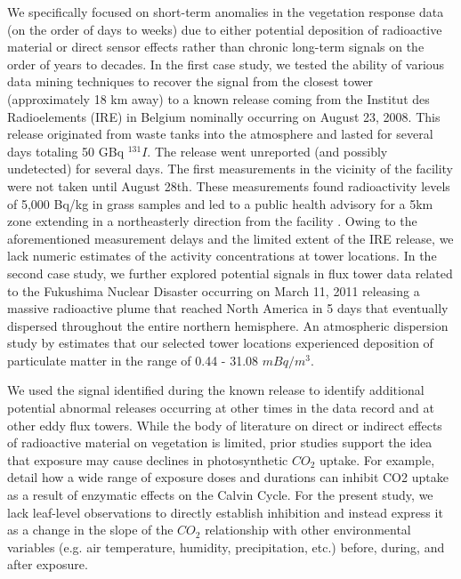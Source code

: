 \documentclass{article}
\begin{document}
We specifically focused on short-term anomalies in the vegetation response data (on the order of days to weeks) due to either potential deposition of radioactive material or direct sensor effects rather than chronic long-term signals on the order of years to decades. In the first case study, we tested the ability of various data mining techniques to recover the signal from the closest tower (approximately 18 km away) to a known release coming from the Institut des Radioelements (IRE) in Belgium nominally occurring on August 23, 2008. This release originated from waste tanks into the atmosphere and lasted for several days totaling 50 GBq $^{131}I$. The release went unreported (and possibly undetected) for several days. The first measurements in the vicinity of the facility were not taken until August 28th. These measurements found radioactivity levels of 5,000 Bq/kg in grass samples and led to a public health advisory for a 5km zone extending in a northeasterly direction from the facility \citep{carle2010individual}. Owing to the aforementioned measurement delays and the limited extent of the IRE release, we lack numeric estimates of the activity concentrations at tower locations. In the second case study, we further explored potential signals in flux tower data related to the Fukushima Nuclear Disaster occurring on March 11, 2011 releasing a massive radioactive plume that reached North America in 5 days that eventually dispersed throughout the entire northern hemisphere. An atmospheric dispersion study by \citet{meszarosPredictabilityDispersionFukushimaderived2016} estimates that our selected tower locations experienced deposition of particulate matter in the range of 0.44 - 31.08 $mBq/m^{3}$.

We used the signal identified during the known release to identify additional potential abnormal releases occurring at other times in the data record and at other eddy flux towers. While the body of literature on direct or indirect effects of radioactive material on vegetation is limited, prior studies support the idea that exposure may cause declines in photosynthetic $CO_2$ uptake. For example, \citet{gudkovEffectIonizingRadiation2019} detail how a wide range of exposure doses and durations can inhibit CO2 uptake as a result of enzymatic effects on the Calvin Cycle. For the present study, we lack leaf-level observations to directly establish inhibition and instead express it as a change in the slope of the $CO_2$ relationship with other environmental variables (e.g. air temperature, humidity, precipitation, etc.) before, during, and after exposure.
\end{document}
